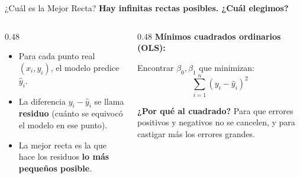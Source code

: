 \documentclass[aspectratio=169, 11pt]{beamer}
\begin{document}
\begin{frame}[shrink=5]{¿Cuál es la Mejor Recta?}
  \vspace{-4pt}
  {\footnotesize\color{arcaDark}\bfseries
    Hay infinitas rectas posibles. ¿Cuál elegimos?}

  \vspace{8pt}
  \begin{columns}[T]
    \begin{column}{0.48\textwidth}
      {\scriptsize
      \begin{itemize}\setlength{\itemsep}{5pt}
        \item[{\color{arcaRed}\faArrowRight}]
          Para cada punto real $(x_i, y_i)$, el modelo predice $\hat{y}_i$.
        \item[{\color{arcaRed}\faArrowRight}]
          La diferencia $y_i - \hat{y}_i$ se llama \textbf{residuo}
          (cuánto se equivocó el modelo en ese punto).
        \item[{\color{arcaRed}\faArrowRight}]
          La mejor recta es la que hace los residuos \textbf{lo más
          pequeños posible}.
      \end{itemize}
      }
    \end{column}

    \begin{column}{0.48\textwidth}
      {\scriptsize\color{arcaDark}\bfseries
        Mínimos cuadrados ordinarios (OLS):}
      \vspace{4pt}

      \begin{center}
      \begin{tcolorbox}[colback=arcaGray, colframe=arcaRed, boxrule=0.8pt,
                        arc=3pt, width=\textwidth]
      \centering
      \footnotesize
      Encontrar $\beta_0, \beta_1$ que minimizan:
      \[
        \sum_{i=1}^{n} (y_i - \hat{y}_i)^2
      \]
      \end{tcolorbox}
      \end{center}

      \vspace{2pt}
      {\scriptsize\color{textMuted}
        \textbf{¿Por qué al cuadrado?}
        Para que errores positivos y negativos no se cancelen, y para
        castigar más los errores grandes.}
    \end{column}
  \end{columns}
\end{frame}
\end{document}
